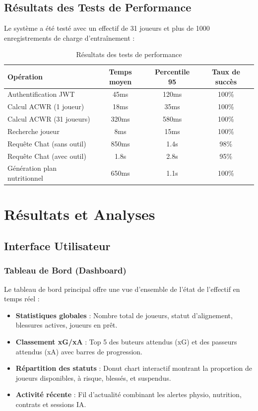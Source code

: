 \subsection{Résultats des Tests de Performance}

Le système a été testé avec un effectif de 31 joueurs et plus de 1000 enregistrements de charge d'entraînement :

\begin{table}[H]
\centering
\begin{tabular}{|l|c|c|c|}
\hline
\textbf{Opération} & \textbf{Temps moyen} & \textbf{Percentile 95} & \textbf{Taux de succès} \\
\hline
Authentification JWT & 45ms & 120ms & 100\% \\
Calcul ACWR (1 joueur) & 18ms & 35ms & 100\% \\
Calcul ACWR (31 joueurs) & 320ms & 580ms & 100\% \\
Recherche joueur & 8ms & 15ms & 100\% \\
Requête Chat (sans outil) & 850ms & 1.4s & 98\% \\
Requête Chat (avec outil) & 1.8s & 2.8s & 95\% \\
Génération plan nutritionnel & 650ms & 1.1s & 100\% \\
\hline
\end{tabular}
\caption{Résultats des tests de performance}
\label{tab:perf-results}
\end{table}

\section{Résultats et Analyses}

\subsection{Interface Utilisateur}

\subsubsection{Tableau de Bord (Dashboard)}

Le tableau de bord principal offre une vue d'ensemble de l'état de l'effectif en temps réel :

\begin{itemize}
    \item \textbf{Statistiques globales} : Nombre total de joueurs, statut d'alignement, blessures actives, joueurs en prêt.
    \item \textbf{Classement xG/xA} : Top 5 des buteurs attendus (xG) et des passeurs attendus (xA) avec barres de progression.
    \item \textbf{Répartition des statuts} : Donut chart interactif montrant la proportion de joueurs disponibles, à risque, blessés, et suspendus.
    \item \textbf{Activité récente} : Fil d'actualité combinant les alertes physio, nutrition, contrats et sessions IA.
\end{itemize}


